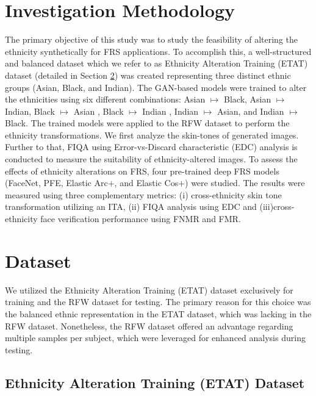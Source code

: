 {	\section{Investigation Methodology}\label{sec:investigation}
    The primary objective of this study was to study the feasibility of altering the ethnicity synthetically for FRS applications. To accomplish this, a well-structured and balanced dataset which we refer to as Ethnicity Alteration Training (ETAT) dataset (detailed in Section \ref{sec:dataset}) was created representing three distinct ethnic groups (Asian, Black, and Indian). The GAN-based models were trained to alter the ethnicities using six different combinations: Asian $\mapsto$ Black, Asian $\mapsto$ Indian, Black $\mapsto$ Asian , Black $\mapsto$ Indian , Indian $\mapsto$ Asian, and Indian $\mapsto$ Black. The trained models were applied to the RFW \cite{Wang_2019_ICCV} dataset to perform the ethnicity transformations. We first analyze the skin-tones of generated images. Further to that, FIQA using Error-vs-Discard characteristic (EDC) analysis is conducted to measure the suitability of ethnicity-altered images. To assess the effects of ethnicity alterations on FRS, four pre-trained deep FRS models (FaceNet, PFE, Elastic Arc+, and Elastic Cos+) were studied.  The results were measured using three complementary metrics: (i) cross-ethnicity skin tone transformation utilizing an ITA, (ii) FIQA analysis using EDC and (iii)cross-ethnicity face verification performance using FNMR and FMR.


   
	
	
	
	
	
	
	
	
	
	
	
	\section{Dataset}\label{sec:dataset}
	We utilized the Ethnicity Alteration Training (ETAT) dataset exclusively for training and the RFW dataset \cite{Wang_2019_ICCV} for testing. The primary reason for this choice was the balanced ethnic representation in the ETAT dataset, which was lacking in the RFW dataset. Nonetheless, the RFW dataset offered an advantage regarding multiple samples per subject, which were leveraged for enhanced analysis during testing. 
	
	\subsection{Ethnicity Alteration Training (ETAT) Dataset}\label{sec:abirbd}
	
}
